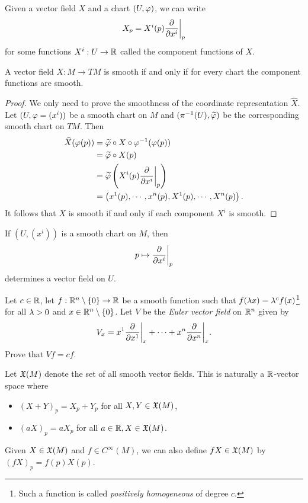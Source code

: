 Given a vector field $X$ and a chart $(U,\varphi)$, we can write
$$ X_p = X^i(p) \pdv{}{x^i}\bigg|_p $$
for some functions $X^i:U \to \mathbb{R}$ called the component functions of $X$. 
\begin{proposition}
    A vector field $X:M \to TM$ is smooth if and only if for every chart the component functions are smooth. 
\end{proposition}
\begin{proof}
    We only need to prove the smoothness of the coordinate representation $\hat{X}$. Let $(U,\varphi=(x^i))$ be a smooth chart on $M$ and $(\pi^{-1}(U), \widetilde{\varphi})$ be the corresponding smooth chart on $TM$.  
    Then 
    \begin{align*}
    \widehat{X}(\varphi(p)) &= \widetilde{\varphi} \circ X \circ \varphi^{-1}(\varphi(p)) \\
    &= \widetilde{\varphi} \circ X (p) \\
    &= \widetilde{\varphi}\left(X^i(p) \pdv{}{x^i}\bigg|_p\right) \\
    &= \left(x^1(p),\cdots,x^n(p),X^1(p),\cdots,X^n(p)\right).
    \end{align*}
    It follows that $X$ is smooth if and only if each component $X^i$ is smooth. 
\end{proof}
\begin{example}
    If $(U,(x^i))$ is a smooth chart on $M$, then 
    $$p \mapsto \pdv{}{x^i}\bigg|_{p}$$ determines a vector field on $U$. 
\end{example}
\begin{example}
    Let $c \in \mathbb{R}$, let $f:\mathbb{R}^n \setminus \{0\} \to \mathbb{R}$ be a smooth function such that $f(\lambda x) = \lambda^c f(x)$\footnote{Such a function is called \textit{positively homogeneous} of degree $c$.} for all $\lambda > 0$ and $x \in \mathbb{R}^n \setminus \{0\}$. Let $V$ be the \textit{Euler vector field} on $\mathbb{R}^n$ given by 
    $$V_x = x^1\pdv{}{x^1}\bigg|_{x} + \cdots + x^n\pdv{}{x^n}\bigg|_{x}.$$ Prove that $Vf = cf$. 
\end{example}

Let $\mathfrak{X}(M)$ denote the set of all smooth vector fields. This is naturally a $\mathbb{R}$-vector space where
\begin{itemize}
    \item $(X+Y)_p = X_p + Y_p$ for all $X,Y \in \mathfrak{X}(M)$,
    \item $(aX)_p = aX_p$ for all $a \in \mathbb{R}, X \in \mathfrak{X}(M)$. 
\end{itemize}
Given $X \in \mathfrak{X}(M)$ and $f \in C^\infty(M)$, we can also define $fX \in \mathfrak{X}(M)$ by 
$(fX)_p = f(p)X(p). $

